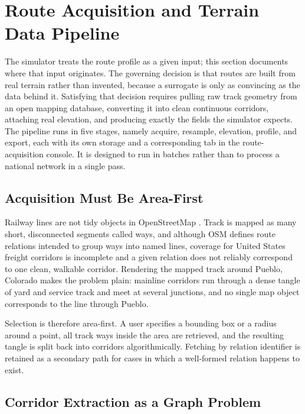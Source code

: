 \documentclass[numbered]{trbunofficial}
\begin{document}
\section{Route Acquisition and Terrain Data Pipeline}\label{sec:routes}

The simulator treats the route profile as a given input; this section documents where that input originates. The governing decision is that routes are built from real terrain rather than invented, because a surrogate is only as convincing as the data behind it. Satisfying that decision requires pulling raw track geometry from an open mapping database, converting it into clean continuous corridors, attaching real elevation, and producing exactly the fields the simulator expects. The pipeline runs in five stages, namely acquire, resample, elevation, profile, and export, each with its own storage and a corresponding tab in the route-acquisition console. It is designed to run in batches rather than to process a national network in a single pass.

\subsection{Acquisition Must Be Area-First}

Railway lines are not tidy objects in OpenStreetMap \citep{osm}. Track is mapped as many short, disconnected segments called ways, and although OSM defines route relations intended to group ways into named lines, coverage for United States freight corridors is incomplete and a given relation does not reliably correspond to one clean, walkable corridor. Rendering the mapped track around Pueblo, Colorado makes the problem plain: mainline corridors run through a dense tangle of yard and service track and meet at several junctions, and no single map object corresponds to the line through Pueblo.

Selection is therefore area-first. A user specifies a bounding box or a radius around a point, all track ways inside the area are retrieved, and the resulting tangle is split back into corridors algorithmically. Fetching by relation identifier is retained as a secondary path for cases in which a well-formed relation happens to exist.

\subsection{Corridor Extraction as a Graph Problem}
\end{document}
